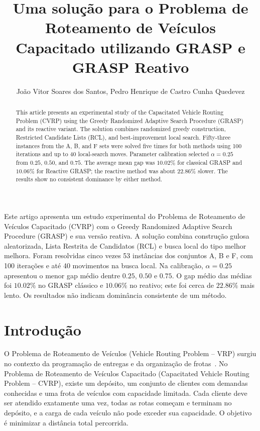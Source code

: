 \documentclass[12pt]{article}
\title{Uma solução para o Problema de Roteamento de Veículos Capacitado utilizando GRASP e GRASP Reativo}
\author{João Vitor Soares dos Santos\inst{1}, Pedro Henrique de Castro Cunha Quedevez\inst{1}}
\begin{document}
\maketitle

\begin{abstract}
This article presents an experimental study of the Capacitated Vehicle Routing Problem (CVRP) using the Greedy Randomized Adaptive Search Procedure (GRASP) and its reactive variant. The solution combines randomized greedy construction, Restricted Candidate Lists (RCL), and best-improvement local search. Fifty-three instances from the A, B, and F sets were solved five times for both methods using 100 iterations and up to 40 local-search moves. Parameter calibration selected $\alpha=0.25$ from $0.25$, $0.50$, and $0.75$. The average mean gap was $10.02\%$ for classical GRASP and $10.06\%$ for Reactive GRASP; the reactive method was about $22.86\%$ slower. The results show no consistent dominance by either method.
\end{abstract}

\begin{resumo}
Este artigo apresenta um estudo experimental do Problema de Roteamento de Veículos Capacitado (CVRP) com o Greedy Randomized Adaptive Search Procedure (GRASP) e sua versão reativa. A solução combina construção gulosa aleatorizada, Lista Restrita de Candidatos (RCL) e busca local do tipo melhor melhora. Foram resolvidas cinco vezes 53 instâncias dos conjuntos A, B e F, com 100 iterações e até 40 movimentos na busca local. Na calibração, $\alpha=0.25$ apresentou o menor gap médio dentre $0.25$, $0.50$ e $0.75$. O gap médio das médias foi $10.02\%$ no GRASP clássico e $10.06\%$ no reativo; este foi cerca de $22.86\%$ mais lento. Os resultados não indicam dominância consistente de um método.
\end{resumo}

\section{Introdução}

O Problema de Roteamento de Veículos (Vehicle Routing Problem -- VRP) surgiu no contexto da programação de entregas e da organização de frotas \,\cite{dantzig1959}. No Problema de Roteamento de Veículos Capacitado (Capacitated Vehicle Routing Problem -- CVRP), existe um depósito, um conjunto de clientes com demandas conhecidas e uma frota de veículos com capacidade limitada. Cada cliente deve ser atendido exatamente uma vez, todas as rotas começam e terminam no depósito, e a carga de cada veículo não pode exceder sua capacidade. O objetivo é minimizar a distância total percorrida.
\end{document}
